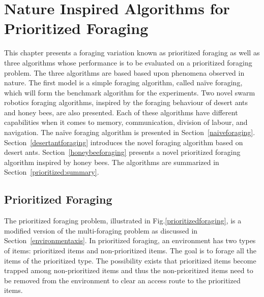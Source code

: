 
\chapter{Nature Inspired Algorithms for Prioritized Foraging}
\label{chap:third}


This chapter presents a foraging variation known as prioritized foraging as well as three algorithms whose performance is to be evaluated on a prioritized foraging problem. The three algorithms are based based upon phenomena observed in nature. The first model is a simple foraging algorithm, called na\"ive foraging, which will form the benchmark algorithm for the experiments. Two novel swarm robotics foraging algorithms, inspired by the foraging behaviour of desert ants and honey bees, are also presented. Each of these algorithms have different capabilities when it comes to memory, communication, division of labour, and navigation. The na\"ive foraging algorithm is presented in Section~\ref{naiveforaging}. Section~\ref{desertantforaging} introduces the novel foraging algorithm based on desert ants. Section~\ref{honeybeeforaging} presents a novel prioritized foraging algorithm inspired by honey bees. The algorithms are summarized in Section~\ref{prioritized:summary}.

\section{Prioritized Foraging}
\label{sec:second:prioritizedforaging}


The prioritized foraging problem, illustrated in Fig.\ref{prioritizedforaging}, is a modified version of the multi-foraging problem as discussed in Section~\ref{environmentaxis}. In prioritized foraging, an environment has two types of items: prioritized items and non-prioritized items. The goal is to forage all the items of the prioritized type. The possibility exists that prioritized items become trapped among non-prioritized items and thus the non-prioritized items need to be removed from the environment to clear an access route to the prioritized items. 

